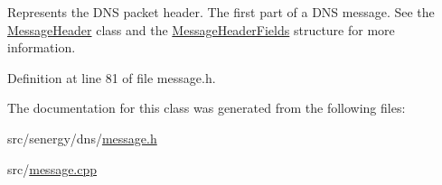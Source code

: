 Represents the D\-N\-S packet header. The first part of a D\-N\-S message. See the \hyperlink{class_senergy_1_1_dns_1_1_message_header}{Message\-Header} class and the \hyperlink{struct_senergy_1_1_dns_1_1_message_header_fields}{Message\-Header\-Fields} structure for more information. 



Definition at line 81 of file message.\-h.



The documentation for this class was generated from the following files\-:\begin{DoxyCompactItemize}
\item 
src/senergy/dns/\hyperlink{message_8h}{message.\-h}\item 
src/\hyperlink{message_8cpp}{message.\-cpp}\end{DoxyCompactItemize}
